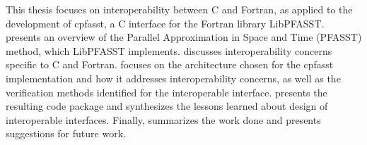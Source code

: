 This thesis focuses on interoperability between C and Fortran, as applied to the development of cpfasst, a C interface for the Fortran library LibPFASST.  presents an overview of the Parallel Approximation in Space and Time (PFASST) method, which LibPFASST implements.  discusses interoperability concerns specific to C and Fortran.  focuses on the architecture chosen for the cpfasst implementation and how it addresses interoperability concerns, as well as the verification methods identified for the interoperable interface.  presents the resulting code package and synthesizes the lessons learned about design of interoperable interfaces. Finally,  summarizes the work done and presents suggestions for future work.